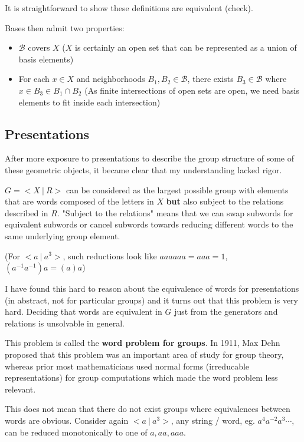 \documentclass[10pt]{article}
\begin{document}
It is straightforward to show these definitions are equivalent (check).

Bases then admit two properties:
\begin{itemize}
	\item{$\mathscr{B}$ covers $X$ ($X$ is certainly an open set that can be
		represented as a union of basis elements)}
\item{For each $x \in X$ and neighborhoods $B_1, B_2 \in \mathscr{B}$, there exists $B_3 \in
	\mathscr{B}$ where $x \in B_3 \in B_1 \cap B_2$ (As finite intersections of
open sets are open, we need basis elements to fit inside each intersection)}
\end{itemize}

\subsection{Presentations}

After more exposure to presentations to describe the group structure of some of
these geometric objects, it became clear that my understanding lacked rigor.

$G = <X~|~R>$ can be considered as the largest possible group with elements
that are words composed of the letters in $X$ \textbf{but} also subject to the
relations described in $R$. "Subject to the relations" means that we can swap
subwords for equivalent subwords or cancel subwords towards reducing different
words to the same underlying group element. 

(For $<a ~|~a^3>$, such reductions look like $aaaaaa = aaa = 1$, $(a^{-1}a^{-1})a = (a)a$)

I have found this hard to reason about the equivalence of words for
presentations (in abstract, not for particular groups) and it turns out that
this problem is very hard. Deciding that words are equivalent in $G$ just from
the generators and relations is unsolvable in general.

\begin{note}
	This problem is called the \textbf{word problem for groups}. In 1911, Max
	Dehn proposed that this problem was an important area of study for group
	theory, whereas prior most mathematicians used normal forms (irreducable
	representations) for group computations which made the word problem less
	relevant.
\end{note}

This does not mean that there do not exist groups where equivalences between
words are obvious. Consider again $<a ~|~a^3>$, any string / word, eg.
$a^4a^{-2}a^3\cdots$, can be reduced monotonically to one of $a, aa, aaa$. 
\end{document}
